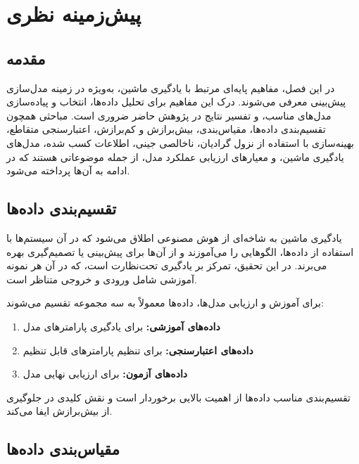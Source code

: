 \chapter{پیش‌زمینه نظری}

\section{مقدمه}

در این فصل، مفاهیم پایه‌ای مرتبط با یادگیری ماشین، به‌ویژه در زمینه مدل‌سازی پیش‌بینی معرفی می‌شوند. درک این مفاهیم برای تحلیل داده‌ها، انتخاب و پیاده‌سازی مدل‌های مناسب، و تفسیر نتایج در پژوهش حاضر ضروری است. مباحثی همچون تقسیم‌بندی داده‌ها، مقیاس‌بندی، بیش‌برازش و کم‌برازش، اعتبارسنجی متقاطع، بهینه‌سازی با استفاده از نزول گرادیان، ناخالصی جینی، اطلاعات کسب شده، مدل‌های یادگیری ماشین، و معیارهای ارزیابی عملکرد مدل، از جمله موضوعاتی هستند که در ادامه به آن‌ها پرداخته می‌شود.

\section{تقسیم‌بندی داده‌ها}

یادگیری ماشین به شاخه‌ای از هوش مصنوعی اطلاق می‌شود که در آن سیستم‌ها با استفاده از داده‌ها، الگوهایی را می‌آموزند و از آن‌ها برای پیش‌بینی یا تصمیم‌گیری بهره می‌برند. در این تحقیق، تمرکز بر یادگیری تحت‌نظارت است، که در آن هر نمونه آموزشی شامل ورودی و خروجی متناظر است.

برای آموزش و ارزیابی مدل‌ها، داده‌ها معمولاً به سه مجموعه تقسیم می‌شوند:

\begin{enumerate}
	\item \textbf{داده‌های آموزشی:} برای یادگیری پارامترهای مدل
	\item \textbf{داده‌های اعتبارسنجی:} برای تنظیم پارامترهای قابل تنظیم
	\item \textbf{داده‌های آزمون:} برای ارزیابی نهایی مدل
\end{enumerate}

تقسیم‌بندی مناسب داده‌ها از اهمیت بالایی برخوردار است و نقش کلیدی در جلوگیری از بیش‌برازش ایفا می‌کند.

\section{مقیاس‌بندی داده‌ها}

